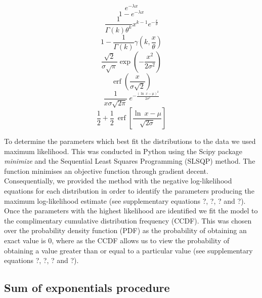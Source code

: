 \documentclass[11pt,usenames,dvipsnames]{article}
\DeclareMathOperator\erf{erf}
\begin{document}
\begin{equation}
e^{-\lambda x}
\end{equation}
\begin{equation}
1 - e^{-\lambda x}
\end{equation}
\begin{equation}
\frac{1}{\Gamma(k)\theta^k}x^{k-1}e^{-\frac{x}{\theta}}
\end{equation}
\begin{equation}
1 - \frac{1}{\Gamma(k)}\gamma(k,\frac{x}{\theta})
\end{equation}
\begin{equation}
\frac{\sqrt{2}}{\sigma \sqrt{\pi}} \exp \left(-\frac{x^2}{2 \sigma^2}\right)
\end{equation}
\begin{equation}
\erf\left(\frac{x}{\sigma \sqrt{2}}\right)
\end{equation}
\begin{equation}
\frac{1}{x \sigma \sqrt{2 \pi}}\ e^{- \frac{(\ln\ x - \mu)^2}{2\sigma^2}}
\end{equation}
\begin{equation}
\frac{1}{2} + \frac{1}{2}\ \erf\left[\frac{\ln\ x - \mu}{\sqrt{2 \sigma}}\right]
\end{equation}

To determine the parameters which best fit the distributions to the data we used maximum likelihood. This was conducted in Python using the Scipy package \textit{minimize} and the Sequential Least Squares Programming (SLSQP) method. The function minimises an objective function through gradient decent. Consequentially, we provided the method with the negative log-likelihood equations for each distribution in order to identify the parameters producing the maximum log-likelihood estimate (see supplementary equations ?, ?, ? and ?). Once the parameters with the highest likelihood are identified we fit the model to the complimentary cumulative distribution frequency (CCDF). This was chosen over the probability density function (PDF) as the probability of obtaining an exact value is 0, where as the CCDF allows us to view the probability of obtaining a value greater than or equal to a particular value (see supplementary equations ?, ?, ? and ?). 


\subsection{Sum of exponentials procedure}
\end{document}
